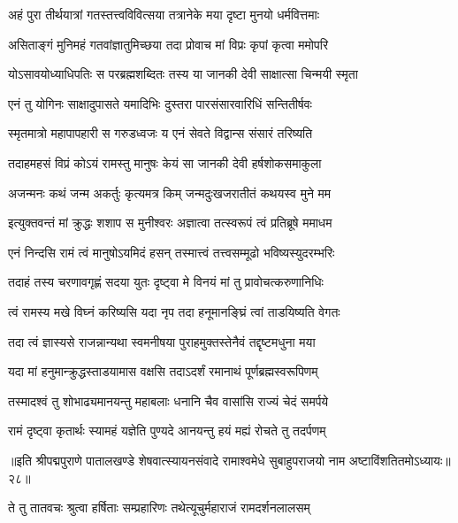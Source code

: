 \twolineshloka
{अहं पुरा तीर्थयात्रां गतस्तत्त्वविवित्सया}
{तत्रानेके मया दृष्टा मुनयो धर्मवित्तमाः}%

\twolineshloka
{असिताङ्गं मुनिमहं गतवांज्ञातुमिच्छया}
{तदा प्रोवाच मां विप्रः कृपां कृत्वा ममोपरि}%

\twolineshloka
{योऽसावयोध्याधिपतिः स परब्रह्मशब्दितः}
{तस्य या जानकी देवी साक्षात्सा चिन्मयी स्मृता}%

\twolineshloka
{एनं तु योगिनः साक्षादुपासते यमादिभिः}
{दुस्तरा पारसंसारवारिधिं सन्तितीर्षवः}%

\twolineshloka
{स्मृतमात्रो महापापहारी स गरुडध्वजः}
{य एनं सेवते विद्वान्स संसारं तरिष्यति}%

\twolineshloka
{तदाहमहसं विप्रं कोऽयं रामस्तु मानुषः}
{केयं सा जानकी देवी हर्षशोकसमाकुला}%

\twolineshloka
{अजन्मनः कथं जन्म अकर्तुः कृत्यमत्र किम्}
{जन्मदुःखजरातीतं कथयस्व मुने मम}%

\twolineshloka
{इत्युक्तवन्तं मां क्रुद्धः शशाप स मुनीश्वरः}
{अज्ञात्वा तत्स्वरूपं त्वं प्रतिब्रूषे ममाधम}%

\twolineshloka
{एनं निन्दसि रामं त्वं मानुषोऽयमिदं हसन्}
{तस्मात्त्वं तत्त्वसम्मूढो भविष्यस्युदरम्भरिः}%

\twolineshloka
{तदाहं तस्य चरणावगृह्णं सदया युतः}
{दृष्ट्वा मे विनयं मां तु प्रावोचत्करुणानिधिः}%

\twolineshloka
{त्वं रामस्य मखे विघ्नं करिष्यसि यदा नृप}
{तदा हनूमानङ्घ्रिं त्वां ताडयिष्यति वेगतः}%

\twolineshloka
{तदा त्वं ज्ञास्यसे राजन्नान्यथा स्वमनीषया}
{पुराहमुक्तस्तेनैवं तद्दृष्टमधुना मया}%

\twolineshloka
{यदा मां हनुमान्क्रुद्धस्ताडयामास वक्षसि}
{तदाऽदर्शं रमानाथं पूर्णब्रह्मस्वरूपिणम्}%

\twolineshloka
{तस्मादश्वं तु शोभाढ्यमानयन्तु महाबलाः}
{धनानि चैव वासांसि राज्यं चेदं समर्पये}%

\twolineshloka
{रामं दृष्ट्वा कृतार्थः स्यामहं यज्ञेति पुण्यदे}
{आनयन्तु हयं मह्यं रोचते तु तदर्पणम्}%

{॥इति श्रीपद्मपुराणे पातालखण्डे शेषवात्स्यायनसंवादे रामाश्वमेधे सुबाहुपराजयो नाम अष्टाविंशतितमोऽध्यायः॥२८॥}



\twolineshloka
{ते तु तातवचः श्रुत्वा हर्षिताः सम्प्रहारिणः}
{तथेत्यूचुर्महाराजं रामदर्शनलालसम्}%


